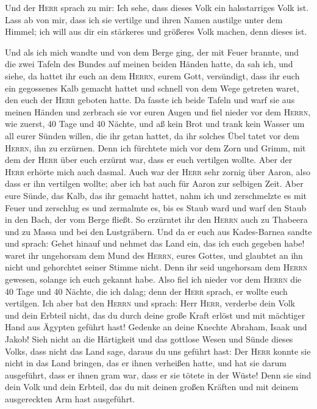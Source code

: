  Und der \textsc{Herr} sprach zu mir: Ich sehe, dass
dieses Volk ein halsstarriges Volk ist.  Lass ab von mir,
dass ich sie vertilge und ihren Namen austilge unter dem Himmel; ich
will aus dir ein stärkeres und größeres Volk machen, denn dieses ist.

 Und als ich mich wandte und von dem Berge ging, der mit
Feuer brannte, und die zwei Tafeln des Bundes auf meinen beiden Händen
hatte,  da sah ich, und siehe, da hattet ihr euch an dem
\textsc{Herrn}, eurem Gott, versündigt, dass ihr euch ein gegossenes
Kalb gemacht hattet und schnell von dem Wege getreten waret, den euch
der \textsc{Herr} geboten hatte.  Da fasste ich beide
Tafeln und warf sie aus meinen Händen und zerbrach sie vor euren Augen
 und fiel nieder vor dem \textsc{Herrn}, wie zuerst, 40
Tage und 40 Nächte, und aß kein Brot und trank kein Wasser um all eurer
Sünden willen, die ihr getan hattet, da ihr solches Übel tatet vor dem
\textsc{Herrn}, ihn zu erzürnen.  Denn ich fürchtete mich
vor dem Zorn und Grimm, mit dem der \textsc{Herr} über euch erzürnt war,
dass er euch vertilgen wollte. Aber der \textsc{Herr} erhörte mich auch
dasmal.  Auch war der \textsc{Herr} sehr zornig über
Aaron, also dass er ihn vertilgen wollte; aber ich bat auch für Aaron
zur selbigen Zeit.  Aber eure Sünde, das Kalb, das ihr
gemacht hattet, nahm ich und zerschmelzte es mit Feuer und zerschlug es
und zermalmte es, bis es Staub ward und warf den Staub in den Bach, der
vom Berge fließt.  So erzürntet ihr den \textsc{Herrn}
auch zu Thabeera und zu Massa und bei den Lustgräbern. 
Und da er euch aus Kades-Barnea sandte und sprach: Gehet hinauf und
nehmet das Land ein, das ich euch gegeben habe! waret ihr ungehorsam dem
Mund des \textsc{Herrn}, eures Gottes, und glaubtet an ihn nicht und
gehorchtet seiner Stimme nicht.  Denn ihr seid ungehorsam
dem \textsc{Herrn} gewesen, solange ich euch gekannt habe.
 Also fiel ich nieder vor dem \textsc{Herrn} die 40 Tage
und 40 Nächte, die ich dalag; denn der \textsc{Herr} sprach, er wollte
euch vertilgen.  Ich aber bat den \textsc{Herrn} und
sprach: Herr \textsc{Herr}, verderbe dein Volk und dein Erbteil nicht,
das du durch deine große Kraft erlöst und mit mächtiger Hand aus Ägypten
geführt hast!  Gedenke an deine Knechte Abraham, Isaak
und Jakob! Sieh nicht an die Härtigkeit und das gottlose Wesen und Sünde
dieses Volks,  dass nicht das Land sage, daraus du uns
geführt hast: Der \textsc{Herr} konnte sie nicht in das Land bringen,
das er ihnen verheißen hatte, und hat sie darum ausgeführt, dass er
ihnen gram war, dass er sie tötete in der Wüste!  Denn
sie sind dein Volk und dein Erbteil, das du mit deinen großen Kräften
und mit deinem ausgereckten Arm hast ausgeführt.

